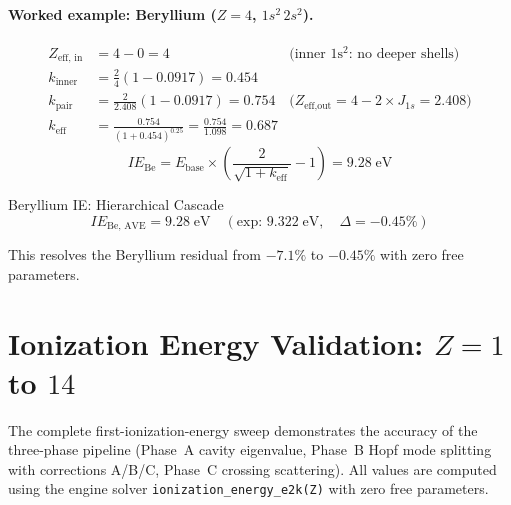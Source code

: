 \paragraph{Worked example: Beryllium ($Z = 4$, $1s^2\,2s^2$).}
\begin{align}
    Z_\text{eff, in} &= 4 - 0 = 4   & \text{(inner 1s$^2$: no deeper shells)} \\
    k_\text{inner} &= \frac{2}{4}\left(1 - 0.0917\right) = 0.454 \\
    k_\text{pair} &= \frac{2}{2.408}\left(1 - 0.0917\right) = 0.754   & \text{($Z_\text{eff,out} = 4 - 2 \times J_{1s} = 2.408$)} \\
    k_\text{eff} &= \frac{0.754}{(1 + 0.454)^{0.25}} = \frac{0.754}{1.098} = 0.687
\end{align}
\begin{equation}
    IE_\text{Be} = E_\text{base} \times \left(\frac{2}{\sqrt{1 + k_\text{eff}}} - 1\right) = 9.28\;\text{eV}
\end{equation}
\begin{resultbox}{Beryllium IE: Hierarchical Cascade}
\begin{equation}
    IE_\text{Be, AVE} = 9.28\;\text{eV} \quad (\text{exp: } 9.322\;\text{eV}, \quad \Delta = -0.45\%)
\end{equation}
\end{resultbox}
This resolves the Beryllium residual from $-7.1\%$ to $-0.45\%$ with zero free parameters.


\section{Ionization Energy Validation: $Z = 1$ to $14$}
\label{sec:ie_validation}

The complete first-ionization-energy sweep demonstrates the accuracy of the three-phase pipeline (Phase~A cavity eigenvalue, Phase~B Hopf mode splitting with corrections A/B/C, Phase~C crossing scattering).  All values are computed using the engine solver \texttt{ionization\_\allowbreak energy\_\allowbreak e2k(Z)} with zero free parameters.

